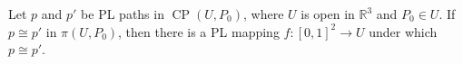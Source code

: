 Let $p$ and $p'$ be PL paths in $\operatorname{CP}(U, P_0)$, where $U$ is open in $\mathbb{R}^3$ and $P_0 \in U$. If $p \cong p'$ in $\pi(U, P_0)$, then there is a PL mapping $f: [0,1]^2 \to U$ under which $p \cong p'$.
